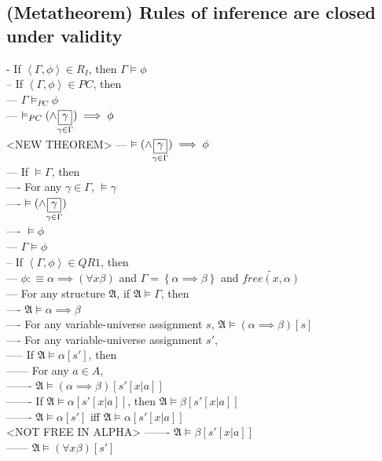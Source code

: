 \documentclass{book}
\newcommand{\is}{:\equiv}
\newcommand{\pnot}[1]{\widetilde{#1}}
\newcommand{\free}[2]{free(#1, #2)}
\newcommand{\set}[1]{\left\{ #1 \right\}}
\newcommand{\seq}[1]{\left\langle #1 \right\rangle}
\newcommand{\vdc}[3]{\underset{#2}{\overset{#3}{\fbox{$#1$}}}}
\begin{document}
\subsection{(Metatheorem) Rules of inference are closed under validity} %
	- If $\seq{\Gamma, \phi} \in R_I$, then $\Gamma \vDash \phi$ \\
		-- If $\seq{\Gamma, \phi} \in PC$, then \\
			--- $\Gamma \vDash_{PC} \phi$ \\
			--- $\vDash_{PC} (\land \vdc{\gamma}{\gamma \in \Gamma}{ }) \implies \phi$ \\ <NEW THEOREM>
			--- $\vDash (\land \vdc{\gamma}{\gamma \in \Gamma}{ }) \implies \phi$ \\
			--- If $\vDash \Gamma$, then \\
				---- For any $\gamma \in \Gamma$, $\vDash \gamma$ \\
				---- $\vDash (\land \vdc{\gamma}{\gamma \in \Gamma}{ })$ \\
				---- $\vDash \phi$ \\
			--- $\Gamma \vDash \phi$ \\
		-- If $\seq{\Gamma, \phi} \in QR1$, then \\
			--- $\phi \is \alpha \implies (\forall x \beta)$ and $\Gamma = \set{\alpha \implies \beta}$ and $\pnot{\free{x}{\alpha}}$ \\
			--- For any structure $\mathfrak{A}$, if $\mathfrak{A} \vDash \Gamma$, then \\
				---- $\mathfrak{A} \vDash \alpha \implies \beta$ \\
				---- For any variable-universe assignment $s$, $\mathfrak{A} \vDash (\alpha \implies \beta)[s]$ \\
				---- For any variable-universe assignment $s'$, \\
					----- If $\mathfrak{A} \vDash \alpha[s']$, then \\
						------ For any $a \in A$, \\
							------- $\mathfrak{A} \vDash (\alpha \implies \beta)[s'[x|a]]$ \\
							------- If $\mathfrak{A} \vDash \alpha[s'[x|a]]$, then $\mathfrak{A} \vDash \beta[s'[x|a]]$ \\
							------- $\mathfrak{A} \vDash \alpha[s']$ iff $\mathfrak{A} \vDash \alpha[s'[x|a]]$ \\ <NOT FREE IN ALPHA>
							------- $\mathfrak{A} \vDash \beta[s'[x|a]]$ \\
						------ $\mathfrak{A} \vDash (\forall x \beta)[s']$ \\
\end{document}
